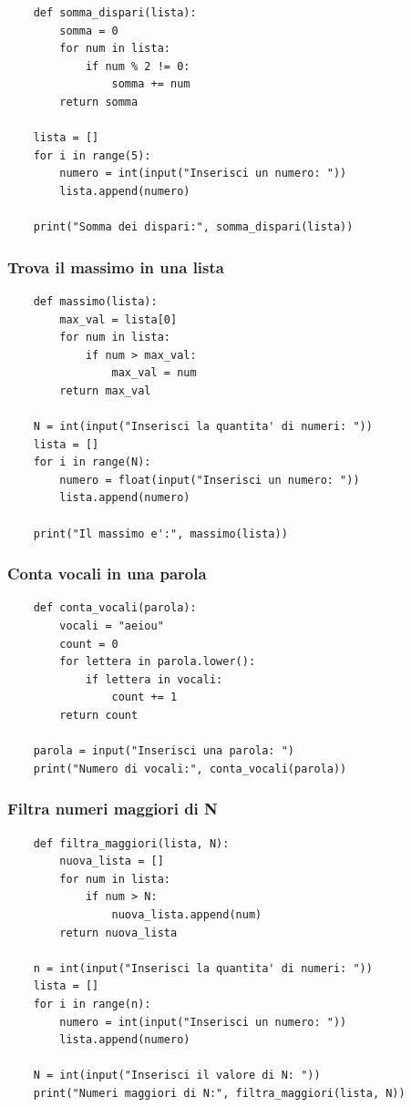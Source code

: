 \documentclass[a4paper,12pt]{article}
\begin{document}
\begin{lstlisting}
	def somma_dispari(lista):
		somma = 0
		for num in lista:
			if num % 2 != 0:
				somma += num
		return somma
	
	lista = []
	for i in range(5):
		numero = int(input("Inserisci un numero: "))
		lista.append(numero)
	
	print("Somma dei dispari:", somma_dispari(lista))
\end{lstlisting}

\newpage
\subsubsection{Trova il massimo in una lista}

\begin{lstlisting}
	def massimo(lista):
		max_val = lista[0]
		for num in lista:
			if num > max_val:
				max_val = num
		return max_val
	
	N = int(input("Inserisci la quantita' di numeri: "))
	lista = []
	for i in range(N):
		numero = float(input("Inserisci un numero: "))
		lista.append(numero)
	
	print("Il massimo e':", massimo(lista))
\end{lstlisting}

\newpage
\subsubsection{Conta vocali in una parola}

\begin{lstlisting}
	def conta_vocali(parola):
		vocali = "aeiou"
		count = 0
		for lettera in parola.lower():
			if lettera in vocali:
				count += 1
		return count
	
	parola = input("Inserisci una parola: ")
	print("Numero di vocali:", conta_vocali(parola))
\end{lstlisting}

\newpage
\subsubsection{Filtra numeri maggiori di N}

\begin{lstlisting}
	def filtra_maggiori(lista, N):
		nuova_lista = []
		for num in lista:
			if num > N:
				nuova_lista.append(num)
		return nuova_lista
	
	n = int(input("Inserisci la quantita' di numeri: "))
	lista = []
	for i in range(n):
		numero = int(input("Inserisci un numero: "))
		lista.append(numero)
	
	N = int(input("Inserisci il valore di N: "))
	print("Numeri maggiori di N:", filtra_maggiori(lista, N))
\end{lstlisting}
\end{document}

